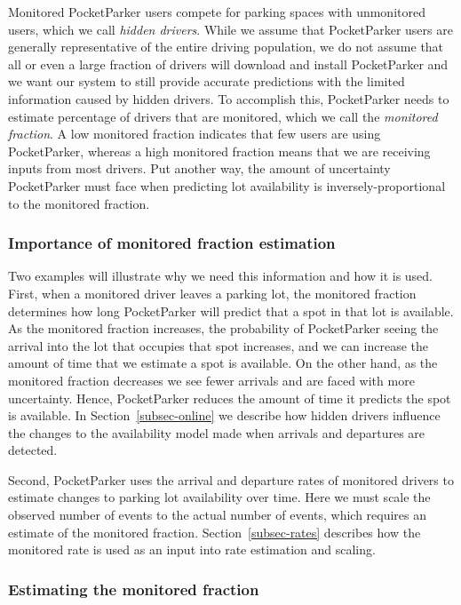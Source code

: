 Monitored PocketParker users compete for parking spaces with unmonitored
users, which we call \textit{hidden drivers}. While we assume that
PocketParker users are generally representative of the entire driving
population, we do not assume that all or even a large fraction of drivers
will download and install PocketParker and we want our system to still
provide accurate predictions with the limited information caused by hidden
drivers. To accomplish this, PocketParker needs to estimate percentage of
drivers that are monitored, which we call the \textit{monitored fraction}. A
low monitored fraction indicates that few users are using PocketParker,
whereas a high monitored fraction means that we are receiving inputs from
most drivers. Put another way, the amount of uncertainty PocketParker must
face when predicting lot availability is inversely-proportional to the
monitored fraction.

\subsubsection{Importance of monitored fraction estimation}

Two examples will illustrate why we need this information and how it is used.
First, when a monitored driver leaves a parking lot, the monitored fraction
determines how long PocketParker will predict that a spot in that lot is
available. As the monitored fraction increases, the probability of
PocketParker seeing the arrival into the lot that occupies that spot
increases, and we can increase the amount of time that we estimate a spot is
available. On the other hand, as the monitored fraction decreases we see
fewer arrivals and are faced with more uncertainty. Hence, PocketParker
reduces the amount of time it predicts the spot is available. In
Section~\ref{subsec-online} we describe how hidden drivers influence the
changes to the availability model made when arrivals and departures are
detected.

Second, PocketParker uses the arrival and departure rates of monitored
drivers to estimate changes to parking lot availability over time. Here we
must scale the observed number of events to the actual number of events,
which requires an estimate of the monitored fraction.
Section~\ref{subsec-rates} describes how the monitored rate is used as an
input into rate estimation and scaling.

\subsubsection{Estimating the monitored fraction}

